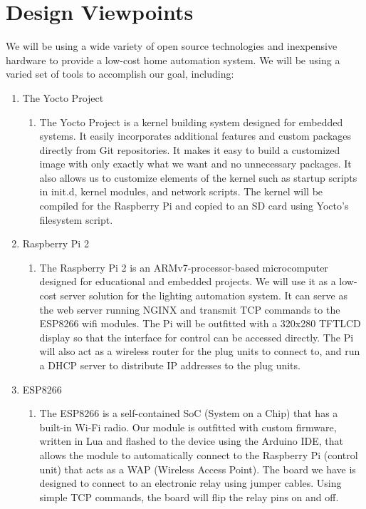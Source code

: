 \documentclass[oneside,openright]{book}
\begin{document}
\section{Design Viewpoints}

We will be using a wide variety of open source technologies and inexpensive
hardware to provide a low-cost home automation system. We will be using a
varied set of tools to accomplish our goal, including:

\begin{enumerate}
    \item The Yocto Project 
    \begin{enumerate}
        \item The Yocto Project is a kernel building system designed for
            embedded systems. It easily incorporates additional features and
            custom packages directly from Git repositories. It makes it easy to
            build a customized image with only exactly what we want and no
            unnecessary packages. It also allows us to customize elements of
            the kernel such as startup scripts in init.d, kernel modules, and
            network scripts. The kernel will be compiled for the Raspberry Pi
            and copied to an SD card using Yocto's filesystem script.
    \end{enumerate} 
        \item Raspberry Pi 2
    \begin{enumerate}
        \item The Raspberry Pi 2 is an ARMv7-processor-based microcomputer
            designed for educational and embedded projects. We will use it as a
            low-cost server solution for the lighting automation system. It can
            serve as the web server running NGINX and transmit TCP commands to
            the ESP8266 wifi modules. The Pi will be outfitted with a 320x280
            TFTLCD display \cite{tftlcd} so that the interface for control can be
            accessed directly.  The Pi will also act as a wireless router for
            the plug units to connect to, and run a DHCP server to distribute
            IP addresses to the plug units.
    \end{enumerate} 
        \item ESP8266
    \begin{enumerate}
        \item The ESP8266 is a self-contained SoC (System on a Chip) that has a
            built-in Wi-Fi radio. Our module is outfitted with custom firmware,
            written in Lua and flashed to the device using the Arduino IDE,
            that allows the module to automatically connect to the Raspberry Pi
            (control unit) that acts as a WAP (Wireless Access Point). The
            board we have is designed to connect to an electronic relay using
            jumper cables. Using simple TCP commands, the board will flip the
            relay pins on and off.
    \end{enumerate}
\end{enumerate}
\end{document}
